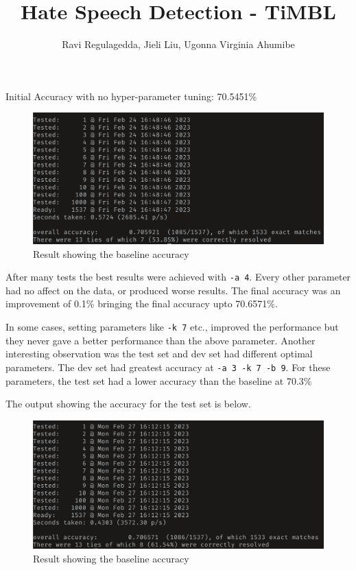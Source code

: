 \documentclass[a4, 11pt]{article}
\title{Hate Speech Detection - TiMBL}
\author{Ravi Regulagedda, Jieli Liu, Ugonna Virginia Ahumibe}
\date{}
\begin{document}
\maketitle

Initial Accuracy with no hyper-parameter tuning: 70.5451\%
\begin{figure}[H]
\center
\includegraphics[scale=0.4]{baseline.png}
\caption{Result showing the baseline accuracy}
\end{figure}
After many tests the best results were achieved with \lstinline{-a 4}. Every other parameter had no affect on the data, or produced worse results. The final accuracy was an improvement of 0.1\% bringing the final accuracy upto 70.6571\%.

In some cases, setting parameters like \lstinline{-k 7} etc., improved the performance but they never gave a better performance than the above parameter. Another interesting observation was the test set and dev set had different optimal parameters. The dev set had greatest accuracy at \lstinline{-a 3 -k 7 -b 9}. For these parameters, the test set had a lower accuracy than the baseline at 70.3\%

The output showing the accuracy for the test set is below.
\begin{figure}[H]
\center
\includegraphics[scale=0.4]{final.png}
\caption{Result showing the baseline accuracy}
\end{figure}
\end{document}

